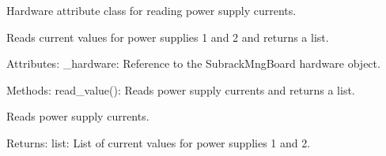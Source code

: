 \documentclass[letterpaper,10pt,english]{sphinxmanual}
\begin{document}
\begin{fulllineitems}
\label{\detokenize{webserverdocs:subrack_hardware.PSCurrent}}
\pysigstartsignatures
{}
\pysigstopsignatures
\sphinxAtStartPar
Hardware attribute class for reading power supply currents.

\sphinxAtStartPar
Reads current values for power supplies 1 and 2 and returns a list.

\sphinxAtStartPar
Attributes:
\sphinxhyphen{} \_hardware: Reference to the SubrackMngBoard hardware object.

\sphinxAtStartPar
Methods:
\sphinxhyphen{} read\_value(): Reads power supply currents and returns a list.

\begin{fulllineitems}
\label{\detokenize{webserverdocs:subrack_hardware.PSCurrent.read_value}}
\pysigstartsignatures
{}
\pysigstopsignatures
\sphinxAtStartPar
Reads power supply currents.

\sphinxAtStartPar
Returns:
list: List of current values for power supplies 1 and 2.

\end{fulllineitems}


\end{fulllineitems}

\end{document}
